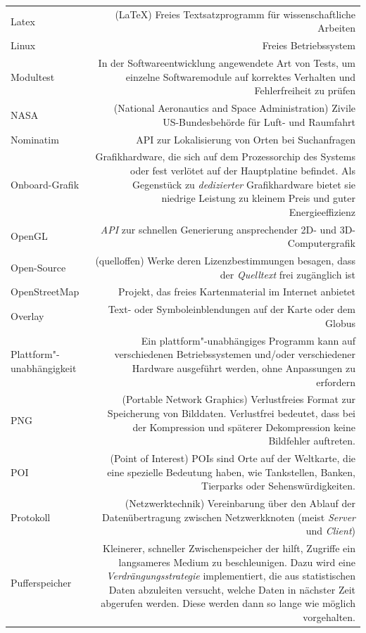 \documentclass[10pt]{scrreprt}
\newcommand{\textref}[1]{\mbox{\raisebox{0.1ex}{\small$\rightarrow$ }\textit{#1}}}
\begin{document}
\begin{longtabu}{L{0.35} R{1.65}}
Latex & (\LaTeX) Freies Textsatzprogramm für wissenschaftliche Arbeiten\\
Linux & Freies Betriebssystem\\
Modultest & In der Softwareentwicklung angewendete Art von Tests, um einzelne Softwaremodule auf korrektes Verhalten und Fehlerfreiheit zu prüfen\\
NASA & (National Aeronautics and Space Administration) Zivile US-Bundesbehörde für Luft- und Raumfahrt\\
Nominatim & API zur Lokalisierung von Orten bei Suchanfragen\\
Onboard-Grafik & Grafikhardware, die sich auf dem Prozessorchip des Systems oder fest verlötet auf der Hauptplatine befindet. Als Gegenstück zu \textit{dedizierter} Grafikhardware bietet sie niedrige Leistung zu kleinem Preis und guter Energieeffizienz\\
OpenGL & \textref{API} zur schnellen Generierung ansprechender 2D- und 3D-Computergrafik\\
Open-Source & (quelloffen) Werke deren Lizenzbestimmungen besagen, dass der \textref{Quelltext} frei zugänglich ist\\
OpenStreetMap & Projekt, das freies Kartenmaterial im Internet anbietet\\
Overlay & Text- oder Symboleinblendungen auf der Karte oder dem Globus\\
Plattform"-unabhängigkeit & Ein plattform"-unabhängiges Programm kann auf verschiedenen Betriebssystemen  und/oder verschiedener Hardware ausgeführt werden, ohne Anpassungen zu erfordern\\
PNG & (Portable Network Graphics) Verlustfreies Format zur Speicherung von Bilddaten. Verlustfrei bedeutet, dass bei der Kompression und späterer Dekompression keine Bildfehler auftreten.\\
POI & (Point of Interest) POIs sind Orte auf der Weltkarte, die eine spezielle Bedeutung haben, wie Tankstellen, Banken, Tierparks oder Sehenswürdigkeiten.\\
Protokoll & (Netzwerktechnik) Vereinbarung über den Ablauf der Datenübertragung zwischen Netzwerkknoten (meist \textref{Server} und \textref{Client})\\
Pufferspeicher & Kleinerer, schneller Zwischenspeicher der hilft, Zugriffe ein langsameres Medium zu beschleunigen. Dazu wird eine \textit{Verdrängungsstrategie} implementiert, die aus statistischen Daten abzuleiten versucht, welche Daten in nächster Zeit abgerufen werden. Diese werden dann so lange wie möglich vorgehalten.\\

\end{longtabu}
\end{document}
